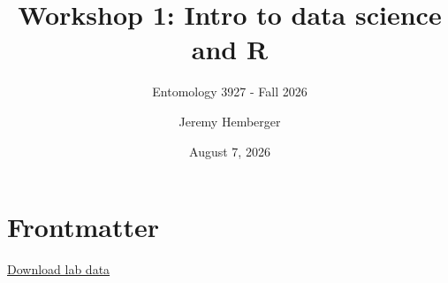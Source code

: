 \documentclass[
  letterpaper,
  DIV=11,
  numbers=noendperiod]{scrartcl}
\title{Workshop 1: Intro to data science and R}
\subtitle{Entomology 3927 - Fall 2026}
\author{Jeremy Hemberger}
\date{August 7, 2026}
\renewcommand*\contentsname{Table of contents}
\newcommand\contentsname{Table of contents}
\begin{document}
\maketitle

\renewcommand*\contentsname{Table of contents}
{
\hypersetup{linkcolor=}
\setcounter{tocdepth}{3}
\tableofcontents
}

\section{Frontmatter}\label{frontmatter}

\href{https://canvas.umn.edu/courses/539629/modules/items/15583284}{Download
lab data}
\end{document}
